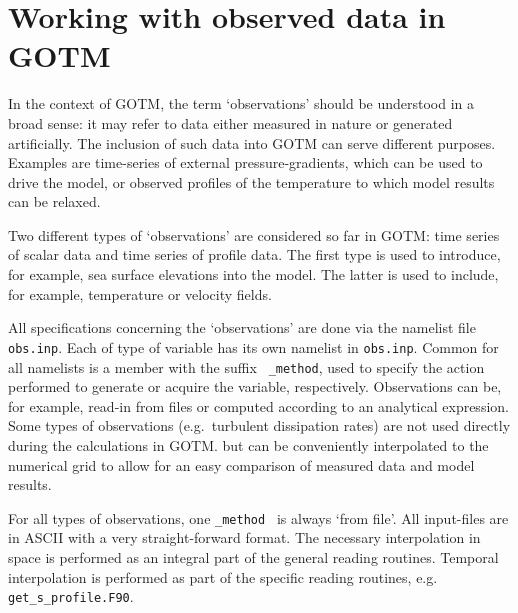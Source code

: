 %
%

\section{Working with observed data in GOTM}

In the context of GOTM, the term `observations' should be understood
in a broad sense: it may refer to data either measured in nature or
generated artificially.  The inclusion of such data into GOTM can
serve different purposes. Examples are time-series of external
pressure-gradients, which can be used to drive the model, or observed
profiles of the temperature to which model results can be relaxed.

Two different types of `observations' are considered so far in GOTM:
time series of scalar data and time series of profile data. The first
type is used to introduce, for example, sea surface elevations into
the model. The latter is used to include, for example, temperature or
velocity fields.


All specifications concerning the `observations' are done via the
namelist file {\tt obs.inp}.  Each of type of variable has its own
namelist in {\tt obs.inp}.  Common for all namelists is a member with
the suffix {\tt
\_method}, used to specify the action performed to generate or
acquire the variable, respectively. Observations can be, for example,
read-in from files or computed according to an analytical expression.
Some types of observations (e.g.\ turbulent dissipation rates) are not
used directly during the calculations in GOTM. but can be conveniently 
interpolated to the numerical grid to allow for an easy comparison
of measured data and model results.

For all types of observations, one {\tt \_method } is always `from
file'.  All input-files are in ASCII with a very straight-forward
format. The necessary interpolation in space is performed as an
integral part of the general reading routines. Temporal interpolation
is performed as part of the specific reading routines, e.g.\ {\tt
get\_s\_profile.F90}.

